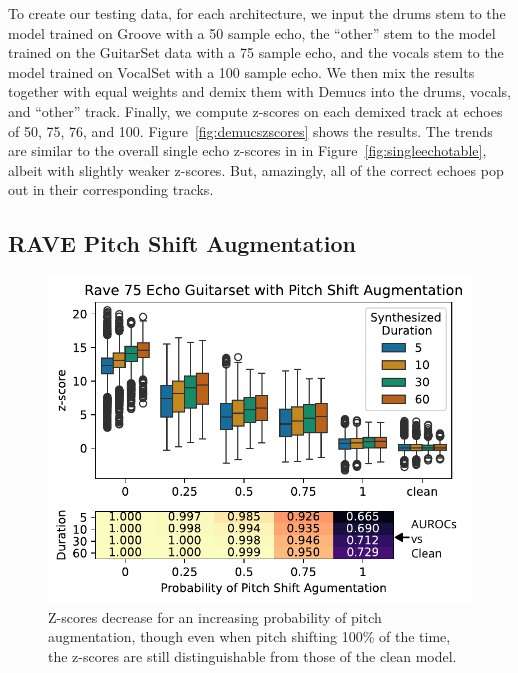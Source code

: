 \documentclass[letterpaper]{article} %
\begin{document}
To create our testing data, for each architecture, we input the drums stem to the model trained on Groove with a 50 sample echo, the ``other'' stem to the model trained on the GuitarSet data with a 75 sample echo, and the vocals stem to the model trained on VocalSet with a 100 sample echo.  We then mix the results together with equal weights and demix them with Demucs into the drums, vocals, and ``other'' track.  Finally, we compute z-scores on each demixed track at echoes of 50, 75, 76, and 100.  Figure~\ref{fig:demucszscores} shows the results.  The trends are similar to the overall single echo z-scores in in Figure~\ref{fig:singleechotable}, albeit with slightly weaker z-scores.  But, amazingly, all of the correct echoes pop out in their corresponding tracks.


\subsection{RAVE Pitch Shift Augmentation}

\begin{figure}
    \centering
    \includegraphics[width=\columnwidth]{figs/RavePercPitchShift.pdf}
    \caption{Z-scores decrease for an increasing probability of pitch augmentation, though even when pitch shifting 100\% of the time, the z-scores are still distinguishable from those of the clean model.}
    \label{fig:pitchshiftaugmentation}
\end{figure}
\end{document}
